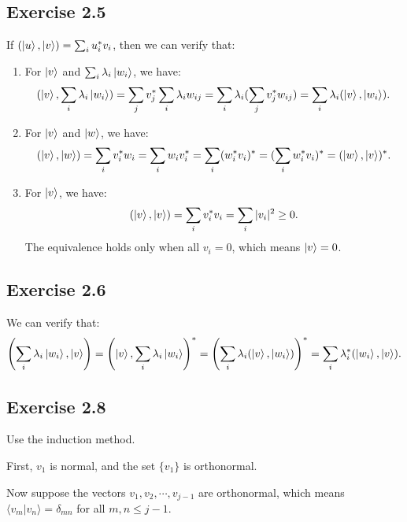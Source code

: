  \subsection*{Exercise 2.5}
 
 If $(\ket{u},\ket{v})=\sum_i u_i^*v_i$, then we can verify that:
 \begin{enumerate}
     \item For $\ket{v}$ and $\sum_i \lambda_i\ket{w_i}$, we have:
     \begin{align}
              (\ket{v},\sum_i \lambda_i\ket{w_i})=\sum_j v_j^*\sum_i \lambda_i w_{ij}= \sum_i\lambda_i(\sum_j v_j^* w_{ij})=\sum_i\lambda_i(\ket{v},\ket{w_i}).
         \end{align}
     \item For $\ket{v}$ and $\ket{w}$, we have:
     \begin{align}
          (\ket{v},\ket{w})=\sum_i v_i^*w_i=\sum_i w_iv_i^*=\sum_i(w_i^*v_i)^*=(\sum_iw_i^*v_i)^*=(\ket{w},\ket{v})^*.
     \end{align}
     \item For $\ket{v}$, we have:
     \begin{align}
              (\ket{v},\ket{v})=\sum_i v_i^*v_i=\sum_i|v_i|^2\geq0.
         \end{align}
     The equivalence holds only when all $v_i=0$, which means $\ket{v}=0$.
 \end{enumerate}
 
\subsection*{Exercise 2.6}
We can verify that:
\begin{align}
\left(\sum_i \lambda_i\ket{w_i},\ket{v}\right)  =\left(\ket{v},\sum_i \lambda_i\ket{w_i}\right)^*  =\left(\sum_i\lambda_i(\ket{v},\ket{w_i})\right)^*=\sum_i\lambda_i^*(\ket{w_i},\ket{v}).
         \end{align}

\subsection*{Exercise 2.8}
Use the induction method. 

First, $v_1$ is normal, and the set $\{v_1\}$ is orthonormal.

Now suppose the vectors $v_1,v_2,\cdots,v_{j-1}$ are orthonormal, which means $\langle v_m|v_n\rangle =\delta_{mn}$ for all $m,n\leq j-1$.

